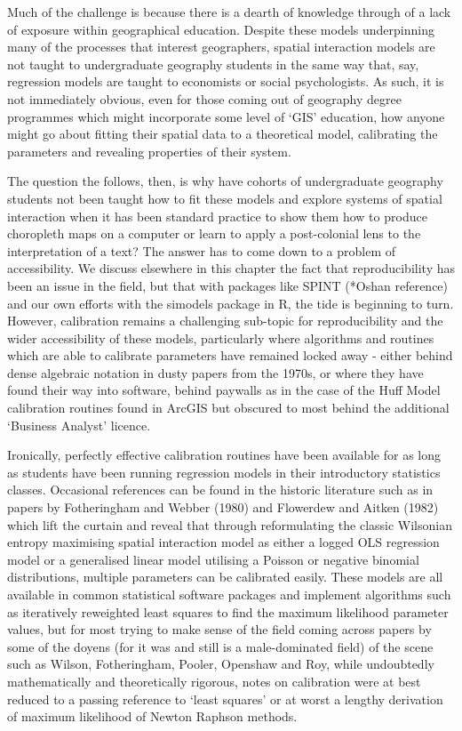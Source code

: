 \documentclass[11pt,letterpaper]{article}
\begin{document}
Much of the challenge is because there is a dearth of knowledge through of a lack of exposure within geographical education.
Despite these models underpinning many of the processes that interest geographers, spatial interaction models are not taught to undergraduate geography students in the same way that, say, regression models are taught to economists or social psychologists.
As such, it is not immediately obvious, even for those coming out of geography degree programmes which might incorporate some level of `GIS' education, how anyone might go about fitting their spatial data to a theoretical model, calibrating the parameters and revealing properties of their system.

The question the follows, then, is why have cohorts of undergraduate geography students not been taught how to fit these models and explore systems of spatial interaction when it has been standard practice to show them how to produce choropleth maps on a computer or learn to apply a post-colonial lens to the interpretation of a text?
The answer has to come down to a problem of accessibility.
We discuss elsewhere in this chapter the fact that reproducibility has been an issue in the field, but that with packages like SPINT (*Oshan reference) and our own efforts with the simodels package in R, the tide is beginning to turn.
However, calibration remains a challenging sub-topic for reproducibility and the wider accessibility of these models, particularly where algorithms and routines which are able to calibrate parameters have remained locked away - either behind dense algebraic notation in dusty papers from the 1970s, or where they have found their way into software, behind paywalls as in the case of the Huff Model calibration routines found in ArcGIS but obscured to most behind the additional `Business Analyst' licence.

Ironically, perfectly effective calibration routines have been available for as long as students have been running regression models in their introductory statistics classes.
Occasional references can be found in the historic literature such as in papers by Fotheringham and Webber (1980) and Flowerdew and Aitken (1982) which lift the curtain and reveal that through reformulating the classic Wilsonian entropy maximising spatial interaction model as either a logged OLS regression model or a generalised linear model utilising a Poisson or negative binomial distributions, multiple parameters can be calibrated easily.
These models are all available in common statistical software packages and implement algorithms such as iteratively reweighted least squares to find the maximum likelihood parameter values, but for most trying to make sense of the field coming across papers by some of the doyens (for it was and still is a male-dominated field) of the scene such as Wilson, Fotheringham, Pooler, Openshaw and Roy, while undoubtedly mathematically and theoretically rigorous, notes on calibration were at best reduced to a passing reference to `least squares' or at worst a lengthy derivation of maximum likelihood of Newton Raphson methods.
\end{document}
